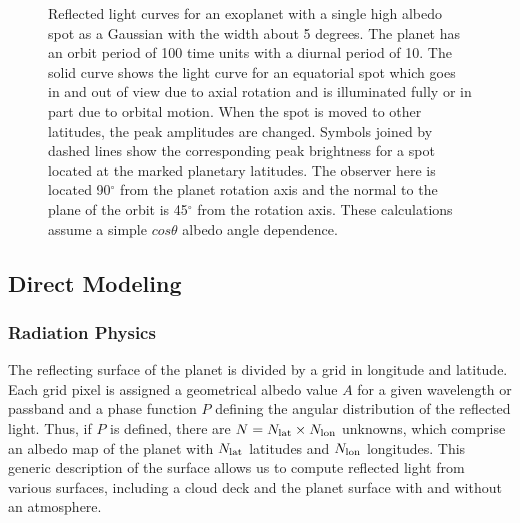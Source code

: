 \documentclass{emulateapj}
\begin{document}
\begin{figure}
\centering
\caption{Reflected light curves for an exoplanet with a single high albedo spot 
as a Gaussian with the width about 5 degrees. The planet has an orbit period of 
100 time units with a diurnal period of 10. 
The solid curve shows the light curve for an equatorial spot which goes in and out of
view due to axial rotation and is illuminated fully or in part due to orbital motion.
When the spot is moved to other latitudes, the peak amplitudes are changed.
Symbols joined by dashed lines show the corresponding peak brightness 
for a spot located at the marked planetary latitudes. 
The observer here is located 90$^\circ$ from the planet rotation axis and 
the normal to the plane of the orbit is 45$^\circ$ from the rotation axis. 
These calculations assume a simple $cos\theta$ albedo angle dependence.}
\label{fig:refspot}
\end{figure}

\subsection{Direct Modeling}\label{sec:dmod}

\subsubsection{Radiation Physics}\label{sec:dmod_rad}

The reflecting surface of the planet is divided by a grid in longitude and latitude.
Each grid pixel is assigned a geometrical albedo value $A$ for a given wavelength 
or passband and a phase function $P$ defining the angular distribution of the reflected light.
Thus, if $P$ is defined, there are $N=N_{\rm lat}\times N_{\rm lon}$ unknowns, which
comprise an albedo map of the planet with $N_{\rm lat}$ latitudes and $N_{\rm lon}$ longitudes.
This generic description of the surface allows us to compute reflected light 
from various surfaces, including a cloud deck and the planet surface 
with and without an atmosphere. 
\end{document}
